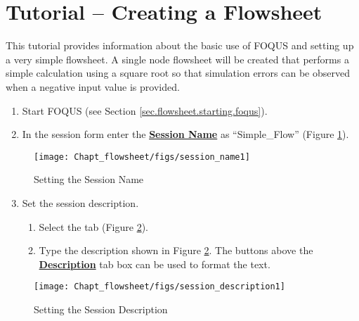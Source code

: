 \section{Tutorial -- Creating a Flowsheet}\label{tutorial.simple.flow}

This tutorial provides information about the basic use of FOQUS and setting up a very simple flowsheet.  A single node flowsheet will be created that performs a simple calculation using a square root so that simulation errors can be observed when a negative input value is provided.

\begin{enumerate}
	\item Start FOQUS (see Section \ref{sec.flowsheet.starting.foqus}).
	\item In the session form enter the \textbf{\underline{Session Name}} as ``Simple\_Flow'' (Figure \ref{fig.session.name1}).
\end{enumerate}

\begin{figure}[H]
	\begin{center}
		\texttt{[image: Chapt\_flowsheet/figs/session\_name1]}
		\caption{Setting the Session Name}
		\label{fig.session.name1}
	\end{center}
\end{figure}

\begin{enumerate}
	\setcounter{enumi}{2}
	\item Set the session description.
	\begin{enumerate}
		\item Select the  tab (Figure \ref{fig.session.description1}).
		\item Type the description shown in Figure \ref{fig.session.description1}.  The buttons above the \textbf{\underline{Description}} tab box can be used to format the text.
	\end{enumerate}
\end{enumerate}

\begin{figure}[H]
	\begin{center}
		\texttt{[image: Chapt\_flowsheet/figs/session\_description1]}
		\caption{Setting the Session Description}
		\label{fig.session.description1}
	\end{center}
\end{figure}


